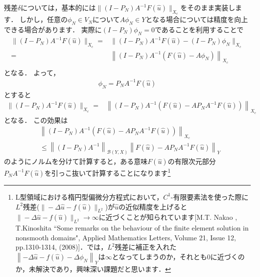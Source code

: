 残差$\delta$については，基本的には$\| (I-P_N) A^{-1} F( \hat{u} ) \|_{X_c}$をそのまま実装します．
しかし，任意の$\phi_N \in V_N$について$A \phi_N \in Y$となる場合については精度を向上できる場合があります．
実際に$(I-P_N) \phi_N = 0$であることを利用することで
\begin{align*}
	\| (I-P_N) A^{-1} F( \hat{u} ) \|_{X_c} =& \| (I-P_N) A^{-1} F( \hat{u} ) - (I-P_N) \phi_N \|_{X_c} \\
	=& \left\| (I-P_N) A^{-1} \left( F( \hat{u} ) - A \phi_N \right) \right\|_{X_c} \\
\end{align*}
となる．
よって，
\begin{align*}
	\phi_N = P_N A^{-1} F( \hat{u} )
\end{align*}
とすると
\begin{align*}
	\| (I-P_N) A^{-1} F( \hat{u} ) \|_{X_c} =& \left\| (I-P_N) A^{-1} \left( F( \hat{u} ) - A P_N A^{-1} F( \hat{u} ) \right) \right\|_{X_c}
\end{align*}
となる．
この効果は
\begin{align*}
	&\left\| (I-P_N) A^{-1} \left( F( \hat{u} ) - A P_N A^{-1} F( \hat{u} ) \right) \right\|_{X_c} \\
	&\le \left\| (I-P_N) A^{-1} \right\|_{{\mathcal B}(Y, X)} \left\| F( \hat{u} ) - A P_N A^{-1} F( \hat{u} ) \right\|_{Y}
\end{align*}
のようにノルムを分けて計算すると，ある意味$F( \hat{u} )$の有限次元部分$P_N A^{-1} F( \hat{u} )$を引っこ抜いて計算することになります\footnote{L型領域における楕円型偏微分方程式において，$C^1$-有限要素法を使った際に$L^2$残差($\| -\Delta \hat{u} - f(\hat{u}) \|_{L^2}$)が$\hat{u}$の近似精度を上げると$\| -\Delta \hat{u} - f(\hat{u}) \|_{L^2} \rightarrow \infty$に近づくことが知られています[M.T. Nakao , T.Kinoshita ``Some remarks on the behaviour of the finite element solution in nonsmooth domains", Applied Mathematics Letters, Volume 21, Issue 12, pp.1310-1314, (2008)]．では，$L^2$残差に補正を入れた$\left\| -\Delta \hat{u} - f(\hat{u}) - \Delta \phi_N \right\|_{Y}$は$\infty$となってしまうのか，それとも$0$に近づくのか，未解決であり，興味深い課題だと思います．}


%
